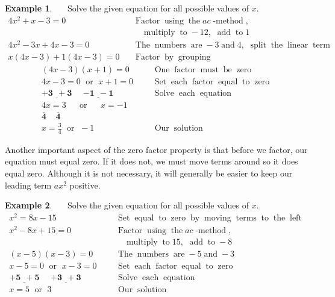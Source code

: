 \documentclass[12pt]{book}
\theoremstyle{definition}
\newtheorem{example}{Example}
\newcommand{\tmmathbf}[1]{\ensuremath{\boldsymbol{#1}}}
\newcommand{\tmop}[1]{\ensuremath{\operatorname{#1}}}
\begin{document}
\begin{example}~~~Solve the given equation for all possible values of $x$.
  \begin{eqnarray*}
    4 x^2 + x - 3 = 0 &  & \tmop{Factor} \tmop{using} \tmop{the} ac
    \tmop{-method},\\
		&& \tmop{~~~multiply} \tmop{to} - 12, \tmop{~add} \tmop{to} 1\\
    4 x^2 - 3 x + 4 x - 3 = 0 &  & \tmop{The} \tmop{numbers} \tmop{are} - 3
    \tmop{and} 4, \tmop{~split} \tmop{the} \tmop{linear} \tmop{term}\\
    x (4 x - 3) + 1 (4 x - 3) = 0 &  & \tmop{Factor} \tmop{by}
    \tmop{grouping}
  \end{eqnarray*}
  \begin{eqnarray*}
    (4 x - 3) (x + 1) = 0~~~ &  & \tmop{One} \tmop{factor} \tmop{must} \tmop{be}
    \tmop{zero}\\
    4 x - 3 = 0 \tmop{~or~} x + 1 = 0~~~ &  & \tmop{Set} \tmop{each} \tmop{factor}
    \tmop{equal} \tmop{to} \tmop{zero}\\
    \tmmathbf{\underline{+ 3 ~~+ 3} ~~~~~~ \underline{- 1 ~~- 1}} &  & \tmop{Solve} \tmop{each}
    \tmop{equation}\\
    4 x = 3 \tmop{~~~~or~~~~} x = - 1 &  & \\
    \tmmathbf{\overline{4} ~~~~~ \overline{4}}~~~~~~~~~~~~~~~~~~~~~  &  & \\
    x = \frac{3}{4} \tmop{~or~} - 1~~~~~ &  & \tmop{Our} \tmop{solution}
  \end{eqnarray*}
\end{example}
Another important aspect of the zero factor property is that before we factor, our equation must equal zero. If it does not, we must move terms around so it does equal zero. Although it is not necessary, it will generally be easier to keep our leading term $ax^2$ positive.
\begin{example}~~~Solve the given equation for all possible values of $x$.
  \begin{eqnarray*}
    x^2 = 8 x - 15~~~ &  & \tmop{Set} \tmop{equal} \tmop{to} \tmop{zero}
    \tmop{by} \tmop{moving} \tmop{terms} \tmop{to} \tmop{the} \tmop{left}\\
    x^2 - 8 x + 15 = 0~~~ &  & \tmop{Factor} \tmop{using} \tmop{the} ac
    \tmop{-method},\\
		&&\tmop{~~~multiply} \tmop{to} 15, \tmop{~add} \tmop{to} - 8\\
    (x - 5) (x - 3) = 0~~~ &  & \tmop{The} \tmop{numbers} \tmop{are} - 5
    \tmop{and} - 3\\
    x - 5 = 0 \tmop{~or~} x - 3 = 0~~~ &  & \tmop{Set} \tmop{each} \tmop{factor}
    \tmop{equal} \tmop{to} \tmop{zero}\\
    \tmmathbf{\underline{+ 5 ~~+ 5} ~~~~~~ \underline{+ 3 ~~+ 3}} &  & \tmop{Solve} \tmop{each}
    \tmop{equation}\\
    x = 5 \tmop{~or~} 3~~~~~ &  & \tmop{Our} \tmop{solution}
  \end{eqnarray*}
\end{example}
\end{document}

